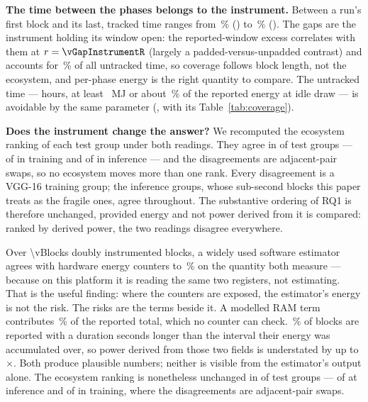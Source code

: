 \textbf{The time between the phases belongs to the instrument.} Between a run's
first block and its last, tracked time ranges from \vCoverageMin\,\%
(\vCoverageWorstEco) to \vCoverageMax\,\% (\vCoverageBestEco). The gaps are the
instrument holding its window open: the reported-window excess correlates with
them at $r = \vGapInstrumentR$ (largely a padded-versus-unpadded contrast) and
accounts for \vGapInstrumentPct\,\% of all untracked time, so coverage follows
block length, not the ecosystem, and per-phase energy is the right quantity to
compare. The untracked time --- \vUntrackedHours{} hours, at least
\vUntrackedMJ~MJ or about \vUntrackedPct\,\% of the reported energy at idle draw
--- is avoidable by the same parameter (, with its
Table~\ref{tab:coverage}).

\textbf{Does the instrument change the answer?} We recomputed the ecosystem
ranking of each test group under both readings. They agree in \vRankIdentical{}
of \vRankBlocks{} test groups --- \vRankTrainIdentical{} of \vRankTrainCells{}
in training and \vRankInferIdentical{} of \vRankInferCells{} in inference ---
and the disagreements are adjacent-pair swaps, so no ecosystem moves more than
one rank. Every disagreement is a VGG-16 training group; the inference groups, whose
sub-second blocks this paper treats as the fragile ones, agree throughout. The
substantive ordering of RQ1 is therefore unchanged, provided energy and not
power derived from it is compared: ranked by derived power, the two readings
disagree everywhere.

\begin{tcolorbox}[colback=gray!5!white, colframe=gray!40!black, title=\textbf{RQ4 Findings: The Apparatus}]
\small
Over \num{\vBlocks} doubly instrumented blocks, a widely used software estimator
agrees with hardware energy counters to \vCCmeasDisagreementPct\,\% on the
quantity both measure --- because on this platform it is reading the same two
registers, not estimating. That is the useful finding: where the counters are
exposed, the estimator's energy is not the risk. The risks are the terms beside
it. A modelled RAM term contributes \vCCramSharePct\,\% of the reported total,
which no counter can check. \vWindowPaddedPct\,\% of blocks are reported with a
duration seconds longer than the interval their energy was accumulated over, so
power derived from those two fields is understated by up to
\vPowerUnderstatedWorst$\times$. Both produce plausible numbers; neither is
visible from the estimator's output alone. The ecosystem ranking is nonetheless
unchanged in \vRankIdentical{} of \vRankBlocks{} test groups ---
\vRankInferIdentical{} of \vRankInferCells{} at inference and
\vRankTrainIdentical{} of \vRankTrainCells{} in training, where the
disagreements are adjacent-pair swaps.
\end{tcolorbox}

